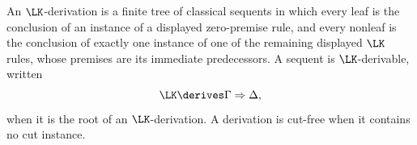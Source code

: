 \begin{definition}[\(\LK\)-derivation]
An \(\LK\)-derivation is a finite tree of classical sequents in which
every leaf is the conclusion of an instance of a displayed zero-premise
rule, and every nonleaf is the conclusion of exactly one instance of one of
the remaining displayed \(\LK\) rules, whose premises are its immediate
predecessors.  A sequent
is \(\LK\)-derivable, written
\[
  \LK\derives\Gamma\Rightarrow\Delta,
\]
when it is the root of an \(\LK\)-derivation.  A derivation is cut-free when it
contains no cut instance.
\end{definition}

